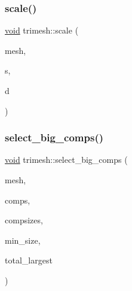 \subsubsection{\texorpdfstring{scale()}{scale()}\hspace{0.1cm}{\footnotesize\ttfamily [3/3]}}
{\footnotesize\ttfamily \hyperlink{namespacetrimesh_a784ddfd979e1c579bda795a8edfc3f43}{void} trimesh\+::scale (\begin{DoxyParamCaption}\item[{\hyperlink{classtrimesh_1_1TriMesh}{Tri\+Mesh} $\ast$}]{mesh,  }\item[{float}]{s,  }\item[{const \hyperlink{namespacetrimesh_a4fc2b83feba99c931f837a0c7d4b4df1}{vec} \&}]{d }\end{DoxyParamCaption})}

\mbox{\label{namespacetrimesh_a12b53f35f9c45e3c2366c825cf928e84}} 
\subsubsection{\texorpdfstring{select\+\_\+big\+\_\+comps()}{select\_big\_comps()}\hspace{0.1cm}{\footnotesize\ttfamily [1/2]}}
{\footnotesize\ttfamily \hyperlink{namespacetrimesh_a784ddfd979e1c579bda795a8edfc3f43}{void} trimesh\+::select\+\_\+big\+\_\+comps (\begin{DoxyParamCaption}\item[{\hyperlink{classtrimesh_1_1TriMesh}{Tri\+Mesh} $\ast$}]{mesh,  }\item[{const vector$<$ int $>$ \&}]{comps,  }\item[{const vector$<$ int $>$ \&}]{compsizes,  }\item[{int}]{min\+\_\+size,  }\item[{int}]{total\+\_\+largest }\end{DoxyParamCaption})}

\mbox{\label{namespacetrimesh_a8224279c81a51548f945fc55a2b8f11f}} 
